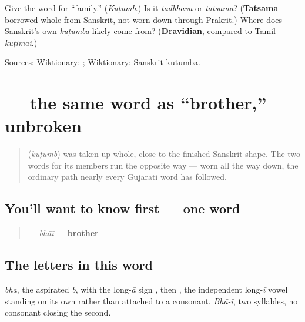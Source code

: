 \begin{tcolorbox}[breakable,colback=teal!4,colframe=teal!35!black,title={Before you move on}]
Give the word for \textquotedblleft{}family.\textquotedblright{} (\emph{Kuṭumb}.) Is it \emph{tadbhava} or \emph{tatsama}? (\textbf{Tatsama} — borrowed whole from Sanskrit, not worn down through Prakrit.) Where does Sanskrit's own \emph{kuṭumba} likely come from? (\textbf{Dravidian}, compared to Tamil \emph{kuṭimai}.)

Sources: \href{https://en.wiktionary.org/wiki/\%E0\%AA\%95\%E0\%AB\%81\%E0\%AA\%9F\%E0\%AB\%81\%E0\%AA\%82\%E0\%AA\%AC}{Wiktionary: }; \href{https://en.wiktionary.org/wiki/\%E0\%A4\%95\%E0\%A5\%81\%E0\%A4\%9F\%E0\%A5\%81\%E0\%A4\%AE\%E0\%A5\%8D\%E0\%A4\%AC}{Wiktionary: Sanskrit kutumba}.
\end{tcolorbox}
\section[\texorpdfstring{\gu{ભાઈ} (bhāī)}{ભાઈ (bhāī)}]{ — the same word as \textquotedblleft{}brother,\textquotedblright{} unbroken}

\label{lesson:GU-C11-bhai}



\begin{quote}
\textbf{} (\emph{kuṭumb}) was taken up whole, close to the finished Sanskrit shape. The two words for its members run the opposite way — worn all the way down, the ordinary path nearly every Gujarati word has followed.
\end{quote}

\subsection*{You'll want to know first — one word}
\begin{quote}
\textbf{} — \emph{bhāī} — \textbf{brother}
\end{quote}

\subsection*{The letters in this word}
\textbf{} \emph{bha}, the aspirated \emph{b}, with the long-\emph{ā} sign \textbf{}, then \textbf{}, the independent long-\emph{ī} vowel standing on its own rather than attached to a consonant. \emph{Bhā-ī}, two syllables, no consonant closing the second.

